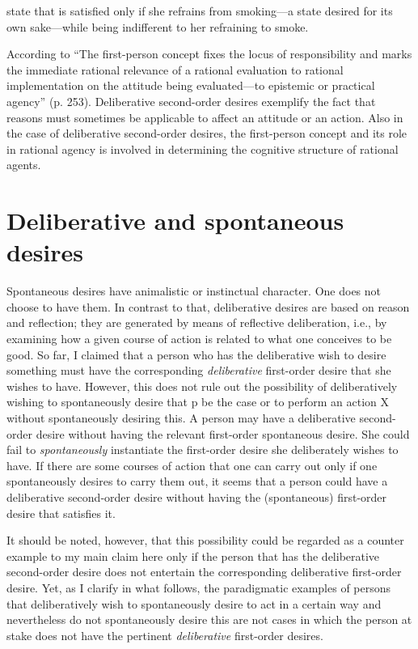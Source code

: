 \documentclass[output=paper,colorlinks,citecolor=brown
]{langscibook}
\begin{document}
state that is satisfied only if she refrains from smoking—a state desired for its own sake—while being indifferent to her refraining to smoke.

According to \citet{burge1998reason} “The first-person concept fixes the locus of responsibility and marks the immediate rational relevance of a rational evaluation to rational implementation on the attitude being evaluated—to epistemic or practical agency” (p. 253). Deliberative second-order desires exemplify the fact that reasons must sometimes be applicable to affect an attitude or an action. Also in the case of deliberative second-order desires, the first-person concept and its role in rational agency is involved in determining the cognitive structure of rational agents.   




\section{Deliberative and spontaneous desires}
    
Spontaneous desires have animalistic or instinctual character. One does not choose to have them. In contrast to that, deliberative desires are based on reason and reflection; they are generated by means of reflective deliberation, i.e., by examining how a given course of action is related to what one conceives to be good. So far, I claimed that a person who has the deliberative wish to desire something must have the corresponding \textit{deliberative} first-order desire that she wishes to have. However, this does not rule out the possibility of deliberatively wishing to spontaneously desire that p be the case or to perform an action X without spontaneously desiring this. A person may have a deliberative second-order desire without having the relevant first-order spontaneous desire. She could fail to \textit{spontaneously} instantiate the first-order desire she deliberately wishes to have. If there are some courses of action that one can carry out only if one spontaneously desires to carry them out, it seems that a person could have a deliberative second-order desire without having the (spontaneous) first-order desire that satisfies it.

It should be noted, however, that this possibility could be regarded as a counter example to my main claim here only if the person that has the deliberative second-order desire does not entertain the corresponding deliberative first-order desire. Yet, as I clarify in what follows, the paradigmatic examples of persons that deliberatively wish to spontaneously desire to act in a certain way and nevertheless do not spontaneously desire this are not cases in which the person at stake does not have the pertinent \textit{deliberative} first-order desires. 
\end{document}
